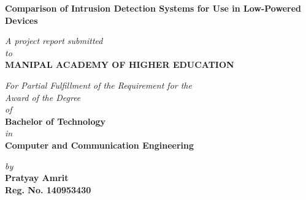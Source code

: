 \documentclass[runningheads,a4paper,12pt]{report}
\begin{document}


\begin{titlepage}
	\begin{center}
	\large{\textbf{Comparison of Intrusion Detection Systems for Use in Low-Powered Devices}}
	\end{center}

	\begin{center}
	\small{\textit{A project report submitted} \\ \textit{to} \\\textbf{MANIPAL ACADEMY OF HIGHER EDUCATION} \\}
	\end{center}


	\vspace{-0.5cm}
	\begin{center}
	\small{\textit{For Partial Fulfillment of the Requirement for the\\ Award of the Degree\\of}} \\
	\textbf{Bachelor of Technology} \\ \textit{in} \\ \textbf{Computer and Communication Engineering}
	\end{center}

	\begin{center}
	\small{\textit{by}} \\
	\textbf{Pratyay Amrit} \\ \textbf{Reg. No. 140953430} \\
	\end{center}


\end{titlepage}
\end{document}
